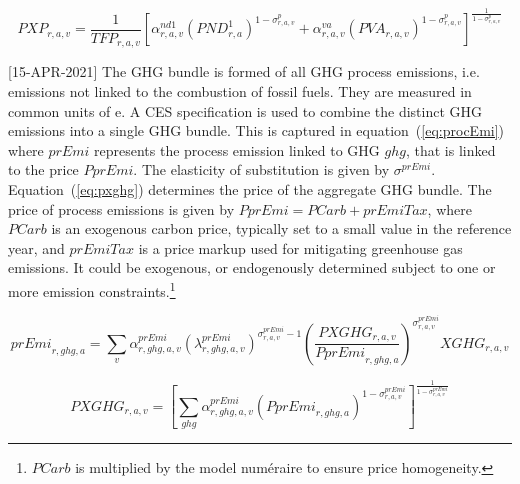 \documentclass[11pt,letterpaper]{report}
\begin{document}
\begin{equation}
\label{eq:pxp}
\mathit{PXP}_{r,a,v} = \frac{1}{\mathit{TFP}_{\mathit{r,a,v}}}
   \left[
      \alpha^{\mathit{nd1}}_{\mathit{r,a,v}}
      \left( \mathit{PND}^1_{r,a}
      \right)^{1 - \sigma^{\mathit{p}}_{\mathit{r,a,v}}}
   +  \alpha^{\mathit{va}}_{\mathit{r,a,v}}
      \left( \mathit{PVA}_{r,a,v}
      \right)^{1 - \sigma^{\mathit{p}}_{\mathit{r,a,v}}}
   \right]^{\frac {1} {1 - \sigma^{\mathit{p}}_{\mathit{r,a,v}}}}
\end{equation}

[15-APR-2021] The GHG bundle is formed of all GHG process emissions, i.e.
emissions not linked to the combustion of fossil fuels. They are measured
in common units of \COT{}e. A CES specification is used to combine
the distinct GHG emissions into a single GHG bundle. This
is captured in equation~(\ref{eq:procEmi}) where $\mathit{prEmi}$
represents the process emission linked to GHG $\mathit{ghg}$, that
is linked to the price $\mathit{PprEmi}$. The elasticity of
substitution is given by $\sigma^{\mathit{prEmi}}$.
Equation~(\ref{eq:pxghg}) determines the price of the aggregate
GHG bundle. The price of process emissions is given by
$\mathit{PprEmi} = \mathit{PCarb} + \mathit{prEmiTax}$,
where $\mathit{PCarb}$ is an exogenous carbon price, typically
set to a small value in the reference year, and $\mathit{prEmiTax}$
is a price markup used for mitigating greenhouse gas emissions.
It could be exogenous, or endogenously determined subject to
one or more emission constraints.\footnote{$\mathit{PCarb}$ is
multiplied by the model num\'eraire to ensure price homogeneity.}

\begin{equation}
\label{eq:procEmi}
\mathit{prEmi}_{r,\mathit{ghg},a} = \sum_v{
   \alpha^{\mathit{prEmi}}_{r,\mathit{ghg},a,v}
   \left(\lambda^{\mathit{prEmi}}_{r,\mathit{ghg},a,v}
   \right)^{\sigma^{\mathit{prEmi}}_{\mathit{r,a,v}}-1}
   \left( \frac{\mathit{PXGHG}_{r,a,v}} {\mathit{PprEmi}_{r,\mathit{ghg},a}}
   \right)^{\sigma^{\mathit{prEmi}}_{\mathit{r,a,v}}}
   \mathit{XGHG}_{r,a,v}
}
\end{equation}

\begin{equation}
\label{eq:pxghg}
\mathit{PXGHG}_{r,a,v} =
   \left[\sum_{\mathit{ghg}}{
      \alpha^{\mathit{prEmi}}_{r,\mathit{ghg},a,v}
      \left( \mathit{PprEmi}_{r,\mathit{ghg},a}
      \right)^{1 - \sigma^{\mathit{prEmi}}_{\mathit{r,a,v}}}}
   \right]^{\frac {1} {1 - \sigma^{\mathit{\mathit{prEmi}}}_{\mathit{r,a,v}}}}
\end{equation}
\end{document}
